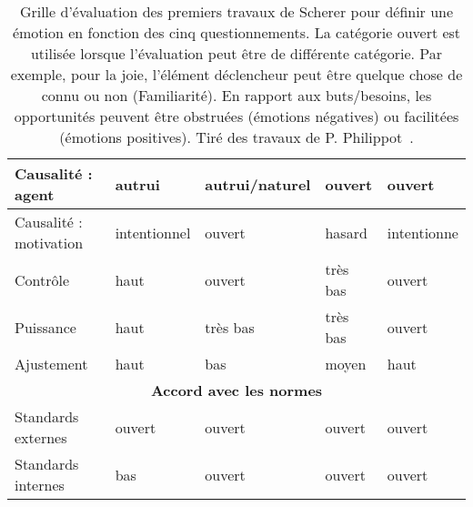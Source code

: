 \begin{table}[tbp]
\begin{tabular}{|l|l|l|l|l|}
Causalité : agent                                     & autrui                                                     & autrui/naturel                                      & ouvert                                                   & ouvert                                              \\ \hline
Causalité : motivation                                & intentionnel                                               & ouvert                                              & hasard                                                   & intentionne                                         \\ \hline
Contrôle                                              & haut                                                       & ouvert                                              & très bas                                                 & ouvert                                              \\ \hline
Puissance                                             & haut                                                       & très bas                                            & très bas                                                 & ouvert                                              \\ \hline
Ajustement                                            & haut                                                       & bas                                                 & moyen                                                    & haut                                                \\ \hline
\multicolumn{5}{|c|}{\textbf{Accord avec les normes}}                                                                                                                                                                                                                                     \\ \hline
Standards externes                                    & ouvert                                                     & ouvert                                              & ouvert                                                   & ouvert                                              \\ \hline
Standards internes                                    & bas                                                        & ouvert                                              & ouvert                                                   & ouvert                                              \\ \hline
\end{tabular}
\label{tab:Scherer}
\caption{Grille d'évaluation des premiers travaux de Scherer pour définir une émotion en fonction des cinq questionnements. La catégorie ouvert est utilisée lorsque l'évaluation peut être de différente catégorie. Par exemple, pour la joie, l'élément déclencheur peut être quelque chose de connu ou non (Familiarité). En rapport aux buts/besoins, les opportunités peuvent être obstruées (émotions négatives) ou facilitées (émotions positives). Tiré des travaux de P. Philippot~\cite{Philippot2007}.}
\end{table}
